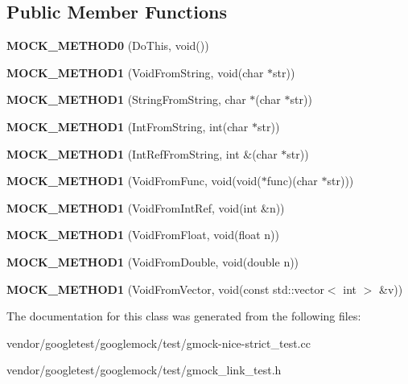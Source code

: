 \subsection*{Public Member Functions}
\begin{DoxyCompactItemize}
\item 
\mbox{\label{class_mock_ae710f23cafb1a2f17772e8805d6312d2}} 
{\bfseries M\+O\+C\+K\+\_\+\+M\+E\+T\+H\+O\+D0} (Do\+This, void())
\item 
\mbox{\label{class_mock_ada59eea6991953353f332e3ea1e74444}} 
{\bfseries M\+O\+C\+K\+\_\+\+M\+E\+T\+H\+O\+D1} (Void\+From\+String, void(char $\ast$str))
\item 
\mbox{\label{class_mock_a2db4d82b6f92b4e462929f651ac4c3b1}} 
{\bfseries M\+O\+C\+K\+\_\+\+M\+E\+T\+H\+O\+D1} (String\+From\+String, char $\ast$(char $\ast$str))
\item 
\mbox{\label{class_mock_ae73b4ee90bf6d84205d2b1c17f0b8433}} 
{\bfseries M\+O\+C\+K\+\_\+\+M\+E\+T\+H\+O\+D1} (Int\+From\+String, int(char $\ast$str))
\item 
\mbox{\label{class_mock_a2cece30a3ea92b34f612f8032fe3a0f9}} 
{\bfseries M\+O\+C\+K\+\_\+\+M\+E\+T\+H\+O\+D1} (Int\+Ref\+From\+String, int \&(char $\ast$str))
\item 
\mbox{\label{class_mock_ac70c052254fa9816bd759c006062dc47}} 
{\bfseries M\+O\+C\+K\+\_\+\+M\+E\+T\+H\+O\+D1} (Void\+From\+Func, void(void($\ast$func)(char $\ast$str)))
\item 
\mbox{\label{class_mock_ae2379efbc030f1adf8b032be3bdf081d}} 
{\bfseries M\+O\+C\+K\+\_\+\+M\+E\+T\+H\+O\+D1} (Void\+From\+Int\+Ref, void(int \&n))
\item 
\mbox{\label{class_mock_a3fd62026610c5d3d3aeaaf2ade3e18aa}} 
{\bfseries M\+O\+C\+K\+\_\+\+M\+E\+T\+H\+O\+D1} (Void\+From\+Float, void(float n))
\item 
\mbox{\label{class_mock_a890668928abcd28d4d39df164e7b6dd8}} 
{\bfseries M\+O\+C\+K\+\_\+\+M\+E\+T\+H\+O\+D1} (Void\+From\+Double, void(double n))
\item 
\mbox{\label{class_mock_a50e2bda4375a59bb89fd5652bd33eb0f}} 
{\bfseries M\+O\+C\+K\+\_\+\+M\+E\+T\+H\+O\+D1} (Void\+From\+Vector, void(const std\+::vector$<$ int $>$ \&v))
\end{DoxyCompactItemize}


The documentation for this class was generated from the following files\+:\begin{DoxyCompactItemize}
\item 
vendor/googletest/googlemock/test/gmock-\/nice-\/strict\+\_\+test.\+cc\item 
vendor/googletest/googlemock/test/gmock\+\_\+link\+\_\+test.\+h\end{DoxyCompactItemize}
